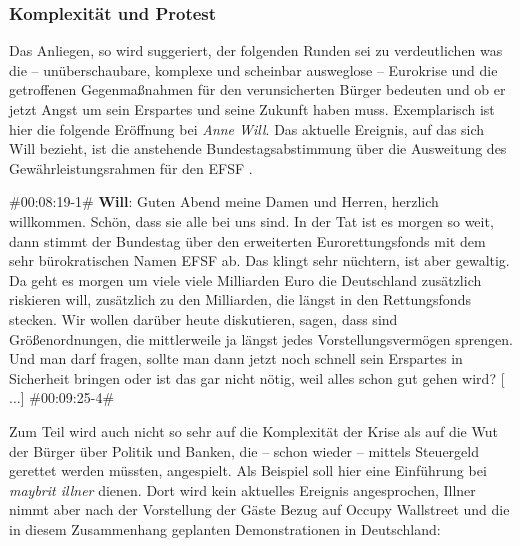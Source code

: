 \subsubsection{Komplexität und Protest}

Das Anliegen, so wird suggeriert, der folgenden Runden sei zu verdeutlichen was die – unüberschaubare, komplexe und scheinbar ausweglose – Eurokrise und die getroffenen Gegenmaßnahmen für den verunsicherten Bürger bedeuten und ob er jetzt Angst um sein Erspartes und seine Zukunft haben muss. Exemplarisch ist hier die folgende Eröffnung bei \textit{Anne Will}. Das aktuelle Ereignis, auf das sich Will bezieht, ist die anstehende Bundestagsabstimmung über die Ausweitung des Gewährleistungsrahmen für den EFSF \parencite{deutscherbundestagDeutscherBundestagBeschluesseo.J.}.

\begin{description}
	\begin{linenumbers}[1]
		\item \#00:08:19-1\# \textbf{Will}: Guten Abend meine Damen und Herren, herzlich willkommen. Schön, dass sie alle bei uns sind. In der Tat ist es morgen so weit, dann stimmt der Bundestag über den erweiterten Eurorettungsfonds mit dem sehr bürokratischen Namen EFSF ab. Das klingt sehr nüchtern, ist aber gewaltig. Da geht es morgen um viele viele Milliarden Euro die Deutschland zusätzlich riskieren will, zusätzlich zu den Milliarden, die längst in den Rettungsfonds stecken. Wir wollen darüber heute diskutieren, sagen, dass sind Größenordnungen, die mittlerweile ja längst jedes Vorstellungsvermögen sprengen. Und man darf fragen, sollte man dann jetzt noch schnell sein Erspartes in Sicherheit bringen oder ist das gar nicht nötig, weil alles schon gut gehen wird? [$\ldots$] \#00:09:25-4\#
	\end{linenumbers}
\end{description}

Zum Teil wird auch nicht so sehr auf die Komplexität der Krise als auf die Wut der Bürger über Politik und Banken, die – schon wieder – mittels Steuergeld gerettet werden müssten, angespielt. Als Beispiel soll hier eine Einführung bei \textit{maybrit illner} dienen. Dort wird kein aktuelles Ereignis angesprochen, Illner nimmt aber nach der Vorstellung der Gäste Bezug auf Occupy Wallstreet und die in diesem Zusammenhang geplanten Demonstrationen in Deutschland:

